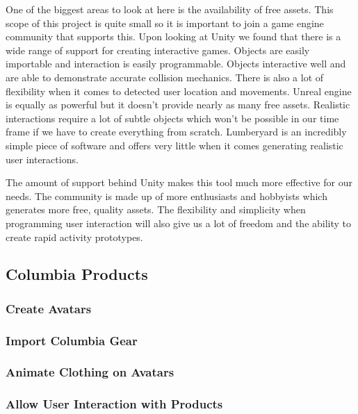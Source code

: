 \documentclass[10pt,journal,compsoc,onecolumn, draftclsnofoot]{IEEEtran}
\begin{document}
One of the biggest areas to look at here is the availability of free assets. This scope of this project is quite small so it is important to join a game engine community that supports this. Upon looking at Unity we found that there is a wide range of support for creating interactive games. Objects are easily importable and interaction is easily programmable. Objects interactive well and are able to demonstrate accurate collision mechanics. There is also a lot of flexibility when it comes to detected user location and movements. Unreal engine is equally as powerful but it doesn’t provide nearly as many free assets. Realistic interactions require a lot of subtle objects which won’t be possible in our time frame if we have to create everything from scratch. Lumberyard is an incredibly simple piece of software and offers very little when it comes generating realistic user interactions.

The amount of support behind Unity makes this tool much more effective for our needs. The community is made up of more enthusiasts and hobbyists which generates more free, quality assets. The flexibility and simplicity when programming user interaction will also give us a lot of freedom and the ability to create rapid activity prototypes.
\vspace{2mm}


\subsection{Columbia Products}
\subsubsection{Create Avatars}

\subsubsection{Import Columbia Gear}

\subsubsection{Animate Clothing on Avatars}

\subsubsection{Allow User Interaction with Products}
\end{document}
